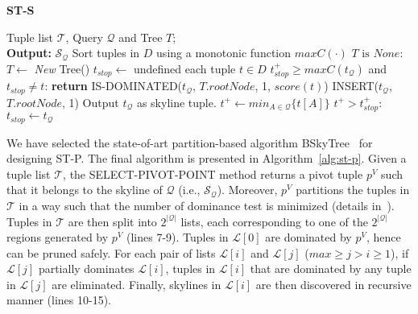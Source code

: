 \begin{algorithm}[htb]
\caption{{\bf ST-S}}
\begin{algorithmic}[1]
\label{alg:st-s}
 Tuple list $\mathcal{T}$, Query $\mathcal{Q}$ and Tree $T$; \\ {\bf Output:} $\mathcal{S}_\mathcal{Q}$
\STATE Sort tuples in $D$ using a monotonic function $maxC(\cdot)$
 $T \text{ is } None$: $T \leftarrow$ {\it New} Tree()%
\STATE $t_{stop} \leftarrow$ undefined
 each tuple $t \in D$
    \STATE {} $t_{stop}^+ \geq maxC(t_{\mathcal{Q}})$ and $t_{stop} \neq t$: {\bf return}
    \STATE {} IS-DOMINATED($t_\mathcal{Q}$, $T.rootNode$, 1, $score(t)$)
        \STATE \hindent[2] INSERT($t_\mathcal{Q}$, $T.rootNode$, 1)
        \STATE \hindent[2] Output $t_\mathcal{Q}$ as skyline tuple.
        \STATE \hindent[2] $t^+ \leftarrow  min_{A \in \mathcal{Q}}\{t[A]\}$
        \STATE {} $t^+ > t_{stop}^+$: $t_{stop} \leftarrow t_{\mathcal{Q}}$
\end{algorithmic}
\end{algorithm}


\vspace{1mm}
 We have selected the state-of-art partition-based algorithm BSkyTree~\cite{lee2014scalable} for designing ST-P. The final algorithm is presented in Algorithm~\ref{alg:st-p}. Given a tuple list $\mathcal{T}$, the SELECT-PIVOT-POINT method returns a pivot tuple $p^V$ such that it belongs to the skyline of $\mathcal{Q}$ (i.e., $\mathcal{S_{\mathcal{Q}}}$). Moreover, $p^V$ partitions the tuples in $\mathcal{T}$ in a way such that the number of dominance test is minimized (details in~\cite{lee2014scalable}). Tuples in $\mathcal{T}$ are then split into $2^{|\mathcal{Q}|}$ lists, each corresponding to one of the $2^{|\mathcal{Q}|}$ regions generated by $p^V$ (lines 7-9). Tuples in $\mathcal{L}[0]$ are dominated by $p^V$, hence can be pruned safely. For each pair of lists $\mathcal{L}[i]$ and $\mathcal{L}[j]$ ($max \geq j> i \geq 1$), if $\mathcal{L}[j]$ partially dominates $\mathcal{L}[i]$, tuples in $\mathcal{L}[i]$ that are dominated by any tuple in $\mathcal{L}[j]$ are eliminated. Finally, skylines in $\mathcal{L}[i]$ are then discovered in recursive manner (lines 10-15).

